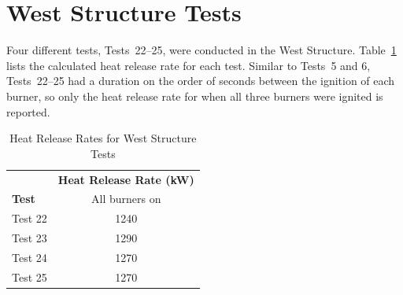 \documentclass[12pt,oneside]{book}
\begin{document}
\section{West Structure Tests}
\label{sec:west_procedure}
Four different tests, Tests~22--25, were conducted in the West Structure. Table~\ref{table:HRR_West} lists the calculated heat release rate for each test. Similar to Tests~5 and 6, Tests~22--25 had a duration on the order of seconds between the ignition of each burner, so only the heat release rate for when all three burners were ignited is reported.   

\begin{table}[!ht]
\caption{Heat Release Rates for West Structure Tests}
\begin{tabular}{lc}
 \toprule
					& 	\textbf{Heat Release Rate (kW)}	\\
\textbf{Test}		& All burners on \\
 \midrule
Test 22				&     	1240 	  \\
Test 23				&     	1290 	  \\
Test 24				& 	    1270 	  \\
Test 25				&     	1270 	  \\
\bottomrule
\end{tabular}
\label{table:HRR_West}
\end{table}
\end{document}
